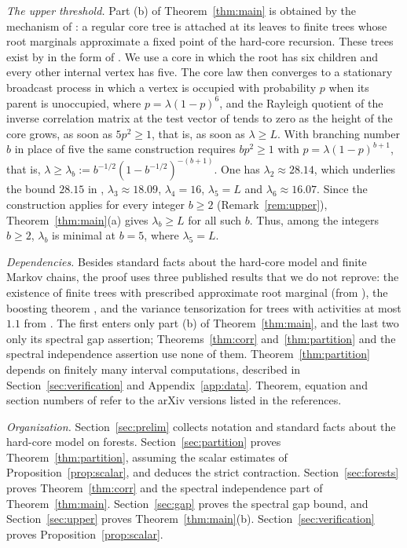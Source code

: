 \documentclass{amsart}
\numberwithin{equation}{section}
\numberwithin{table}{section}
\theoremstyle{definition}
\theoremstyle{remark}
\begin{document}
\emph{The upper threshold.} Part (b) of Theorem~\ref{thm:main} is obtained by the mechanism of \cite[Section~5.2]{CYYZ}: a regular core tree is attached at its leaves to finite trees whose root marginals approximate a fixed point of the hard-core recursion. These trees exist by \cite[Section~5]{RSV} in the form of \cite[Lemma~57]{CYYZ}. We use a core in which the root has six children and every other internal vertex has five. The core law then converges to a stationary broadcast process in which a vertex is occupied with probability $p$ when its parent is unoccupied, where $p=\lambda(1-p)^6$, and the Rayleigh quotient of the inverse correlation matrix at the test vector of \cite[(21)]{CYYZ} tends to zero as the height of the core grows, as soon as $5p^2\ge1$, that is, as soon as $\lambda\ge L$. With branching number $b$ in place of five the same construction requires $bp^2\ge1$ with $p=\lambda(1-p)^{b+1}$, that is, $\lambda\ge\lambda_b:=b^{-1/2}(1-b^{-1/2})^{-(b+1)}$. One has $\lambda_2\approx28.14$, which underlies the bound $28.15$ in \cite[Theorem~8]{CYYZ}, $\lambda_3\approx18.09$, $\lambda_4=16$, $\lambda_5=L$ and $\lambda_6\approx16.07$. Since the construction applies for every integer $b\ge2$ (Remark~\ref{rem:upper}), Theorem~\ref{thm:main}(a) gives $\lambda_b\ge L$ for all such $b$. Thus, among the integers $b\ge2$, $\lambda_b$ is minimal at $b=5$, where $\lambda_5=L$.

\emph{Dependencies.} Besides standard facts about the hard-core model and finite Markov chains, the proof uses three published results that we do not reprove: the existence of finite trees with prescribed approximate root marginal \cite[Lemma~57]{CYYZ} (from \cite[Section~5]{RSV}), the boosting theorem \cite[Theorem~1.9]{CFYZ}, and the variance tensorization for trees with activities at most $1.1$ from \cite[Section~3]{EHSV}. The first enters only part (b) of Theorem~\ref{thm:main}, and the last two only its spectral gap assertion; Theorems~\ref{thm:corr} and~\ref{thm:partition} and the spectral independence assertion use none of them. Theorem~\ref{thm:partition} depends on finitely many interval computations, described in Section~\ref{sec:verification} and Appendix~\ref{app:data}. Theorem, equation and section numbers of \cite{CFYZ,CYYZ,CLV,EHSV,FLNYZ} refer to the arXiv versions listed in the references.

\emph{Organization.} Section~\ref{sec:prelim} collects notation and standard facts about the hard-core model on forests. Section~\ref{sec:partition} proves Theorem~\ref{thm:partition}, assuming the scalar estimates of Proposition~\ref{prop:scalar}, and deduces the strict contraction. Section~\ref{sec:forests} proves Theorem~\ref{thm:corr} and the spectral independence part of Theorem~\ref{thm:main}. Section~\ref{sec:gap} proves the spectral gap bound, and Section~\ref{sec:upper} proves Theorem~\ref{thm:main}(b). Section~\ref{sec:verification} proves Proposition~\ref{prop:scalar}.
\end{document}
